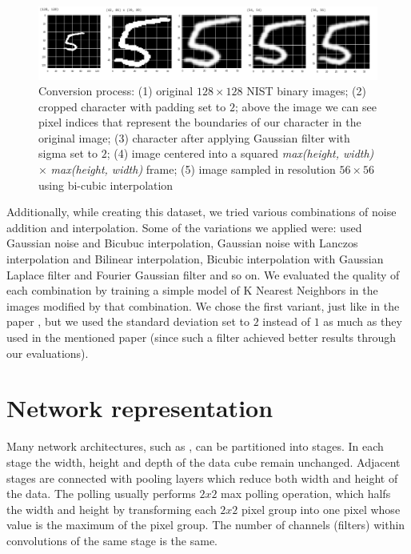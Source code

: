 \documentclass[eng]{simposium}
\begin{document}
\begin{figure}[!ht]
  \centering
  \includegraphics[width=1\textwidth]{conversion.png}
  \caption{Conversion process: 
  (1) original $128 \times 128$ NIST binary images; 
  (2) cropped character with padding set to $2$; above the image we can see pixel indices that represent the boundaries of our character in the original image; 
  (3) character after applying Gaussian filter with sigma set to $2$; 
  (4) image centered into a squared \textit{max(height, width)} $\times$ \textit{max(height, width)} frame; 
  (5) image sampled in resolution $56 \times 56$ using bi-cubic interpolation}
  \label{fig:conversion}
\end{figure}

Additionally, while creating this dataset, we tried various combinations of noise addition and interpolation. 
Some of the variations we applied were: used Gaussian noise and Bicubuc interpolation, Gaussian noise with Lanczos interpolation 
and Bilinear interpolation, Bicubic interpolation with Gaussian Laplace filter and Fourier Gaussian filter and so on. 
We evaluated the quality of each combination by training a simple model of K Nearest Neighbors in the images modified by that 
combination. We chose the first variant, just like in the paper \cite{1}, but we used the standard deviation set to $2$ 
instead of $1$ as much as they used in the mentioned paper (since such a filter achieved better results through our evaluations). 

\section{Network representation}
\label{sec:repr}

Many network architectures, such as \cite{6,7}, can be partitioned into stages.
In each stage the width, height and depth of the data cube remain unchanged. 
Adjacent stages are connected with pooling layers which reduce both width and height of the data.
The polling usually performs $2 x 2$ max polling operation, which halfs the width and height by transforming each $2 x 2$ 
pixel group into one pixel whose value is the maximum of the pixel group.
The number of channels (filters) within convolutions of the same stage is the same.
\end{document}
